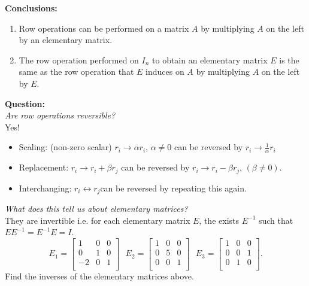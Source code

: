 \documentclass[../main.tex]{subfiles}
\begin{document}
\textbf{Conclusions:}\\
\begin{enumerate}[label=(\roman*)]
  \item Row operations can be performed on a matrix $A$ by multiplying $ A$ on the left by an elementary matrix.
  \item The row operation performed on $I_n$ to obtain an elementary matrix  $E$ is the same as the row operation that $E$ induces on $A$ by multiplying $A$  on the left by $E$.\\
  \end{enumerate}
  \textbf{Question:}\\
  \textit{Are row operations reversible?}\\
  Yes!\\
  \begin{itemize}
          \item Scaling: (non-zero scalar) 
                  $r_i \to \alpha r_i $,  $\alpha \neq 0 $ can be reversed by $r_i \to \frac{1}{\alpha }r_i$
          \item Replacement: $r_i \to r_i + \beta r_j$ can be reversed by  $r_i \to r_i - \beta r_j$, $\left( \beta \neq 0 \right) $.
          \item Interchanging: $r_i \leftrightarrow r_j$can be reversed by repeating this again. 
  \end{itemize}
  \textit{What does this tell us about elementary matrices?} \\
  They are invertible i.e.  for each elementary matrix $E$, the exists $E^{-1}$ such that $E E^{-1}= E^{-1}E=I$.
\[
E_1 = \begin{bmatrix}
1 & 0 & 0\\
0 & 1 & 0\\
-2 & 0 & 1\\
\end{bmatrix} \text{ } E_2 = \begin{bmatrix}
1 & 0 & 0\\
0 & 5 & 0\\
0 & 0 & 1\\
\end{bmatrix} \text{ } E_3 = \begin{bmatrix}
1 & 0 & 0\\
0 & 0 & 1\\
0 & 1 & 0\\
\end{bmatrix}
.\] Find the inverses of the elementary matrices above.\\
\end{document}
